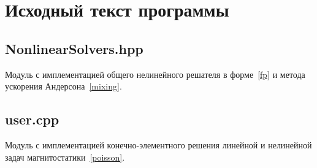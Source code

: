 \documentclass[a4paper, 14pt]{extarticle}
\begin{document}
	\section{Исходный текст программы}
	
	\subsection{NonlinearSolvers.hpp}
	
	Модуль с имплементацией общего нелинейного решателя в форме~\eqref{fp} и метода ускорения Андерсона~\eqref{mixing}.
	
	
	
	\subsection{user.cpp}
	
	Модуль с имплементацией конечно-элементного решения линейной и нелинейной задач магнитостатики~\eqref{poisson}.
	
	
	
\end{document}
